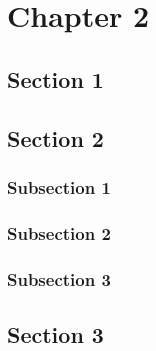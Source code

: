 \chapter{Chapter 2}%
\blindtext%
%
%
\section{Section 1}%
\blindtext%
%
%
\section{Section 2}%
\blindtext%
%
%
\subsection{Subsection 1}%
\blindtext%
%
%
\subsection{Subsection 2}%
\blindtext%
%
%
\subsection{Subsection 3}%
\blindtext%
%
%
\section{Section 3}%
\blindtext%
%
%
